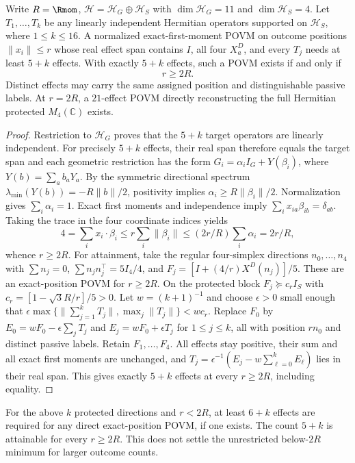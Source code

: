 \documentclass[12pt,a4paper]{article}
\begin{document}
\begin{theorem}
\label{p2c:thm:v353-sharp-protected-readout}
Write $R=\Rmom$, $\mathcal H=\mathcal H_G\oplus\mathcal H_S$
with $\dim\mathcal H_G=11$ and $\dim\mathcal H_S=4$.
Let $T_1,\ldots,T_k$ be any linearly independent Hermitian operators
supported on $\mathcal H_S$, where $1\le k\le 16$.
A normalized exact-first-moment POVM on outcome positions
$\|x_i\|\le r$ whose real effect span contains
$I$, all four $X^D_a$, and every $T_j$ needs at least $5+k$
effects. With exactly $5+k$ effects, such a POVM exists if and only if
\[\boxed{r\ge 2R}.\]
Distinct effects may carry the same assigned position and distinguishable
passive labels. At $r=2R$, a $21$-effect POVM directly reconstructing the
full Hermitian protected $M_4(\mathbb C)$ exists.
\end{theorem}
\begin{proof}
Restriction to $\mathcal H_G$ proves that the $5+k$ target operators
are linearly independent. For precisely $5+k$ effects, their real span
therefore equals the target span and each geometric restriction has the form
$G_i=\alpha_i I_G+Y(\beta_i)$, where
$Y(b)=\sum_a b_aY_a$. By the symmetric directional spectrum
$\lambda_{\min}(Y(b))=-R\|b\|/2$, positivity implies
$\alpha_i\ge R\|\beta_i\|/2$. Normalization gives
$\sum_i\alpha_i=1$. Exact first moments and independence imply
$\sum_i x_{ia}\beta_{ib}=\delta_{ab}$. Taking the trace in the four
coordinate indices yields
\[
4=\sum_i x_i\cdot\beta_i\le r\sum_i\|\beta_i\|
\le (2r/R)\sum_i\alpha_i=2r/R,
\]
whence $r\ge 2R$.
For attainment, take the regular four-simplex directions $n_0,\ldots,n_4$
with $\sum n_j=0$, $\sum n_jn_j^\top=5I_4/4$, and
$F_j=[I+(4/r)X^D(n_j)]/5$. These are an exact-position POVM for
$r\ge 2R$. On the protected block
$F_j\succeq c_rI_S$ with
$c_r=[1-\sqrt3R/r]/5>0$. Let $w=(k+1)^{-1}$ and choose
$\epsilon>0$ small enough that
$\epsilon\max\{\|\sum_{j=1}^kT_j\|,\max_j\|T_j\|\}<wc_r$.
Replace $F_0$ by $E_0=wF_0-\epsilon\sum_jT_j$ and
$E_j=wF_0+\epsilon T_j$ for $1\le j\le k$, all with position
$rn_0$ and distinct passive labels. Retain $F_1,\ldots,F_4$.
All effects stay positive, their sum and all exact first moments are unchanged,
and $T_j=\epsilon^{-1}(E_j-w\sum_{\ell=0}^kE_\ell)$
lies in their real span. This gives exactly $5+k$ effects at every
$r\ge 2R$, including equality.
\end{proof}
\begin{corollary}
\label{p2c:cor:v353-readout-penalty}
For the above $k$ protected directions and $r<2R$, at least $6+k$
effects are required for any direct exact-position POVM, if one exists.
The count $5+k$ is attainable for every $r\ge2R$. This does not settle
the unrestricted below-$2R$ minimum for larger outcome counts.
\end{corollary}
\end{document}
